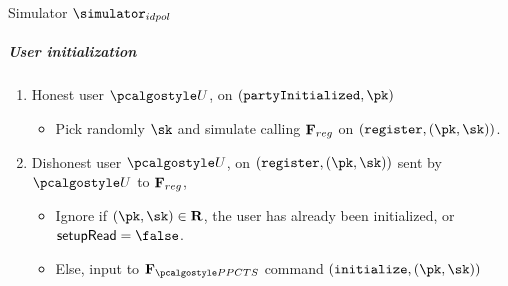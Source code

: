 \documentclass[runningheads,10pt]{llncs}
\numberwithin{equation}{section}
\begin{document}
\begin{simbox}{Simulator $\simulator_{idpol}$}
  \subparagraph{User initialization}
  \begin{enumerate}
  \item Honest user $\user$, on $(\partyInitialized, \pk)$
    \begin{itemize}
    \item Pick randomly $\sk$ and simulate calling $\mathbf{F}_{{reg}}$ on $(\register, (\pk,
      \sk))$. 
    \end{itemize}
  \item Dishonest user $\user$, on $(\register, (\pk, \sk))$ sent by $\user$ to
    $\mathbf{F}_{{reg}}$,
    \begin{itemize}
    \item Ignore if $(\pk, \sk) \in \REL$, the user has already been initialized, or
      $\flag{setupRead} = \false$.
    \item Else, input to $\func{\PPCTS}$ command $(\initialize, (\pk, \sk))$
    \end{itemize}
  \end{enumerate}


\end{simbox}
\end{document}
